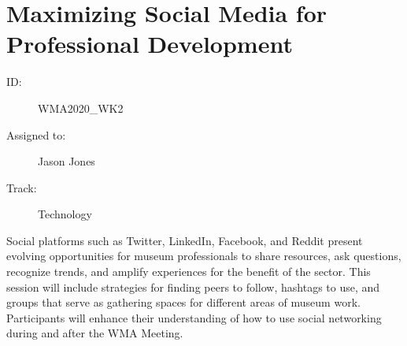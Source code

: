 \documentclass{report}
\begin{document}
          \newpage
          \section{  Maximizing Social Media for Professional Development }
            \begin{description}
              \item [ID:]
              WMA2020\_WK2

              \item [Assigned to:]Jason Jones~
                \item [Track:]Technology~
              \end{description}

              Social platforms such as Twitter, LinkedIn, Facebook, and Reddit present evolving opportunities for museum professionals to share resources, ask questions, recognize trends, and amplify experiences for the benefit of the sector. This session will include strategies for finding peers to follow, hashtags to use, and groups that serve as gathering spaces for different areas of museum work. Participants will enhance their understanding of how to use social networking during and after the WMA Meeting.
\end{document}
